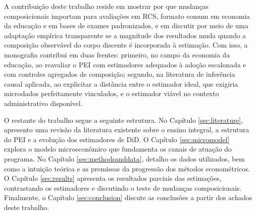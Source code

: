 A contribuição deste trabalho reside em mostrar por que mudanças composicionais importam para avaliações em RCS, formato comum em economia da educação e em bases de exames padronizados, e em discutir por meio de uma adaptação empírica transparente se a magnitude dos resultados muda quando a composição observável do corpo discente é incorporada à estimação. Com isso, a monografia contribui em duas frentes: primeiro, no campo da economia da educação, ao reavaliar o PEI com estimadores adequados à adoção escalonada e com controles agregados de composição; segundo, na literatura de inferência causal aplicada, ao explicitar a distância entre o estimador ideal, que exigiria microdados perfeitamente vinculados, e o estimador viável no contexto administrativo disponível.

O restante do trabalho segue a seguinte estrutura. No Capítulo \ref{sec:literature}, apresento uma revisão da literatura existente sobre o ensino integral, a estrutura do PEI e a evolução dos estimadores de DiD. O Capítulo \ref{sec:micromodel} explora o modelo microeconômico que fundamenta os canais de atuação do programa. No Capítulo \ref{sec:methodsanddata}, detalho os dados utilizados, bem como a intuição teórica e as premissas da progressão dos métodos econométricos. O Capítulo \ref{sec:results} apresenta os resultados parciais das estimações, contrastando os estimadores e discutindo o teste de mudanças composicionais. Finalmente, o Capítulo \ref{sec:conclusion} discute as conclusões a partir dos achados deste trabalho.
